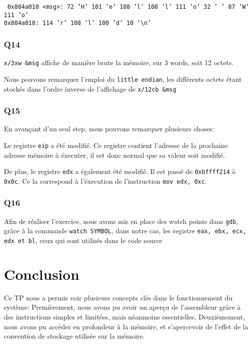 \documentclass[12pt,a4paper,oneside]{article}
\begin{document}
\texttt{
0x804a010 <msg>:    72 'H'  101 'e' 108 'l' 108 'l' 111 'o' 32 ' '  87 'W'  111 'o'\\
0x804a018:  114 'r' 108 'l' 100 'd' 10 '\textbackslash n'
}

\subsubsection{Q14}
\texttt{x/3xw \&msg} affiche de manière brute la mémoire, sur 3 words, soit 12 octets.

Nous pouvons remarquer l'emploi du \texttt{little endian}, les différents octets étant stockés dans l'ordre inverse de l'affichage de \texttt{x/12cb \&msg}

\subsubsection{Q15}
En avançant d'un seul step, nous pouvons remarquer plusieurs choses:

Le registre \texttt{eip} a été modifié. Ce registre contient l'adresse de la prochaine adresse mémoire à éxecuter, il est donc normal que sa valeur soit modifié.

De plus, le registre \texttt{edx} a également été modifié. Il est passé de \texttt{0xbffff214} à \texttt{0x0c}. Ce la correspond à l'éxecution de l'instruction \texttt{mov edx, 0xc}.

\subsubsection{Q16}

Afin de réaliser l'exercice, nous avons mis en place des watch points dans \texttt{gdb}, grâce à la commande \texttt{watch SYMBOL}, dans notre cas, les registre \texttt{eax, ebx, ecx, edx et bl}, ceux qui sont utilisés dans le code source


\newpage
\section{Conclusion}
Ce TP nous a permis voir plusieurs concepts clés dans le fonctionnement du système: Premièrement, nous avons pu avoir un aperçu de l'assembleur grâce à des instructions simples et limitées, mais néanmoins essentielles. Deuxièmement, nous avons pu accèder en profondeur à la mémoire, et s'apercevoir de l'effet de la convention de stockage utilisée sur la mémoire.
\end{document}
